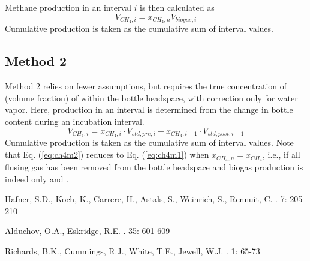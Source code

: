 \documentclass[]{article}
\begin{document}
Methane production in an interval $i$ is then calculated as
\begin{equation}
  \label{eq:ch4m1}
  V_{CH_4, i} = x_{CH_4, n} V_{biogas, i}
\end{equation}
Cumulative production is taken as the cumulative sum of interval values. 

\subsection{Method 2}
Method 2 relies on fewer assumptions, but requires the true concentration of  (volume fraction) of  within the bottle headspace, with correction only for water vapor.
Here,  production in an interval is determined from the change in bottle  content during an incubation interval.
\begin{equation}
  \label{eq:ch4m2}
  V_{CH_4, i} = x_{CH_4, i} \cdot V_{std, pre, i} - x_{CH_4, i - 1} \cdot V_{std, post, i - 1}
\end{equation}
Cumulative production is taken as the cumulative sum of interval values. 
Note that Eq. (\ref{eq:ch4m2}) reduces to Eq. (\ref{eq:ch4m1}) when $x_{CH_4, n} = x_{CH_4}$, i.e., if all flusing gas has been removed from the bottle headspace and biogas production is indeed only  and .

\begin{thebibliography}{1}

Hafner, S.D., Koch, K., Carrere, H., Astals, S., Weinrich, S., Rennuit, C.
    . 
     7: 205-210

Alduchov, O.A., Eskridge, R.E.    
    . 
     35: 601-609

Richards, B.K., Cummings, R.J., White, T.E., Jewell, W.J.    
    . 
     1: 65-73

\end{thebibliography}


%
\end{document}
